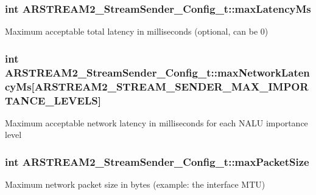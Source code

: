 \subsubsection[{\texorpdfstring{max\+Latency\+Ms}{maxLatencyMs}}]{\setlength{\rightskip}{0pt plus 5cm}int A\+R\+S\+T\+R\+E\+A\+M2\+\_\+\+Stream\+Sender\+\_\+\+Config\+\_\+t\+::max\+Latency\+Ms}\hypertarget{struct_a_r_s_t_r_e_a_m2___stream_sender___config__t_ad5c6d9bb419ef9c7ce6a6294cb4a6448}{}\label{struct_a_r_s_t_r_e_a_m2___stream_sender___config__t_ad5c6d9bb419ef9c7ce6a6294cb4a6448}
Maximum acceptable total latency in milliseconds (optional, can be 0) 
\subsubsection[{\texorpdfstring{max\+Network\+Latency\+Ms}{maxNetworkLatencyMs}}]{\setlength{\rightskip}{0pt plus 5cm}int A\+R\+S\+T\+R\+E\+A\+M2\+\_\+\+Stream\+Sender\+\_\+\+Config\+\_\+t\+::max\+Network\+Latency\+Ms\mbox{[}{\bf A\+R\+S\+T\+R\+E\+A\+M2\+\_\+\+S\+T\+R\+E\+A\+M\+\_\+\+S\+E\+N\+D\+E\+R\+\_\+\+M\+A\+X\+\_\+\+I\+M\+P\+O\+R\+T\+A\+N\+C\+E\+\_\+\+L\+E\+V\+E\+LS}\mbox{]}}\hypertarget{struct_a_r_s_t_r_e_a_m2___stream_sender___config__t_a8a1c3b6ac08d2e415e8d8b24089ceaa9}{}\label{struct_a_r_s_t_r_e_a_m2___stream_sender___config__t_a8a1c3b6ac08d2e415e8d8b24089ceaa9}
Maximum acceptable network latency in milliseconds for each N\+A\+LU importance level 
\subsubsection[{\texorpdfstring{max\+Packet\+Size}{maxPacketSize}}]{\setlength{\rightskip}{0pt plus 5cm}int A\+R\+S\+T\+R\+E\+A\+M2\+\_\+\+Stream\+Sender\+\_\+\+Config\+\_\+t\+::max\+Packet\+Size}\hypertarget{struct_a_r_s_t_r_e_a_m2___stream_sender___config__t_a1c902bac328a3ad7e498098d19953211}{}\label{struct_a_r_s_t_r_e_a_m2___stream_sender___config__t_a1c902bac328a3ad7e498098d19953211}
Maximum network packet size in bytes (example\+: the interface M\+TU) 
